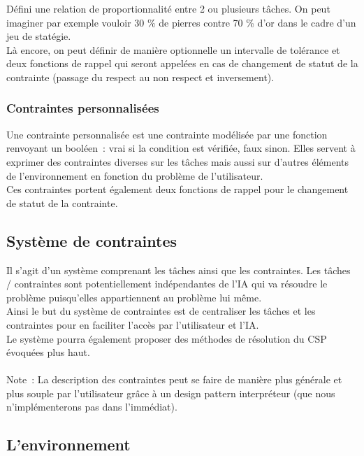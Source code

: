 Défini une relation de proportionnalité entre 2 ou plusieurs tâches.
On peut imaginer par exemple vouloir 30 \% de pierres contre 70 \% d'or dans le cadre d'un jeu de statégie.\\
\indent Là encore, on peut définir de manière optionnelle un intervalle de tolérance et deux fonctions de rappel qui seront appelées en cas de changement de statut de la contrainte (passage du respect au non respect et inversement).

\subsubsection{Contraintes personnalisées}

Une contrainte personnalisée est une contrainte modélisée par une fonction renvoyant un booléen~: vrai si la condition est vérifiée, faux sinon.
Elles servent à exprimer des contraintes diverses sur les tâches mais aussi sur d'autres éléments de l'environnement en fonction du problème de l'utilisateur.\\

Ces contraintes portent également deux fonctions de rappel pour le changement de statut de la contrainte.

\subsection{Système de contraintes}
Il s'agit d'un système comprenant les tâches ainsi que les contraintes. Les  tâches / contraintes sont potentiellement indépendantes de l'IA qui va résoudre le problème puisqu'elles appartiennent au problème lui même.\\

Ainsi le but du système de contraintes est de centraliser les tâches et les contraintes pour en faciliter l'accès par l'utilisateur et l'IA.\\
\indent Le système pourra également proposer des méthodes de résolution du CSP évoquées plus haut.\\\\

Note~: La description des contraintes peut se faire de manière plus générale et plus souple par l'utilisateur grâce à un design pattern interpréteur (que nous n'implémenterons pas dans l'immédiat).


\subsection{L'environnement}


